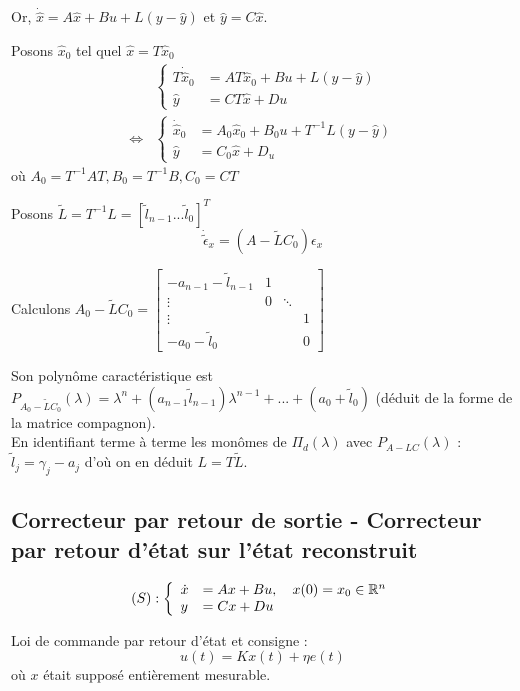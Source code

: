 \documentclass[main.tex]{subfiles}
\begin{document}
Or, $\dot{\hat{x}} = A\hat{x} + Bu + L(y-\hat{y})$ et $\hat{y} = C\hat{x}$.

Posons $\hat{x}_0$ tel quel $\hat{x} = T\hat{x}_0$
\begin{align*}
& \left\{
\begin{array}{ll}
T\dot{\hat{x}}_0 & = AT\hat{x}_0 + Bu + L(y-\hat{y}) \\
\hat{y} & = CT\hat{x} + Du
\end{array}
\right. \\
\Leftrightarrow & \left\{
\begin{array}{ll}
\dot{\hat{x}}_0 & = A_0\hat{x}_0 + B_0u + T^{-1}L(y-\hat{y}) \\
\hat{y} & = C_0\hat{x} + D_u
\end{array}
\right.
\end{align*}
où $ A_0 = T^{-1}AT, B_0 = T^{-1}B, C_0 = CT$

Posons $\tilde{L} = T^{-1}L = [\tilde{l}_{n-1} ... \tilde{l}_0]^T$
\[ \dot{\tilde{\epsilon}}_x = (A-\tilde{L}C_0)\epsilon_x\]

Calculons $A_0-\tilde{L}C_0 =
\left[ \begin{array}{cccc}
-a_{n-1}-\tilde{l}_{n-1} & 1 \\
\vdots & 0 & \ddots \\
\vdots & & & 1 \\
-a_0-\tilde{l}_0   & & & 0
\end{array}\right]$

Son polynôme caractéristique est $P_{A_0-\tilde{L}C_0}(\lambda) = \lambda^n + (a_{n-1}\tilde{l}_{n-1})\lambda^{n-1} + ... + (a_0 + \tilde{l}_0)$ (déduit de la forme de la matrice compagnon).\\

En identifiant terme à terme les monômes de $\Pi_d(\lambda)$ avec $P_{A-LC}(\lambda)$ : $\tilde{l}_j = \gamma_j - a_j$ d'où on en déduit $L = T\tilde{L}$.

\subsection{Correcteur par retour de sortie - Correcteur par retour d'état sur l'état reconstruit}

\[ (S) :
\left\{
\begin{array}{ll}
\dot{x} &= Ax + Bu,\quad x(0) = x_0 \in \mathbb{R}^n \\
y & = Cx+Du
\end{array}
\right.
\]

Loi de commande par retour d'état et consigne :
\[ u(t) = Kx(t) + \eta e(t) \] où $x$ était supposé entièrement mesurable.\\
\end{document}
